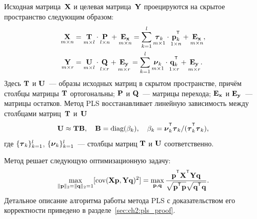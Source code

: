 Исходная матрица~$\mathbf{X}$ и целевая матрица~$\mathbf{Y}$ проецируются на скрытое пространство следующим образом:
\begin{align}
	\label{ch1:eq:PLS_X}
	\underset{m \times n}{\bX} 
	&= \underset{m \times l}{\bT} \cdot \underset{l \times n}{\bP} + \underset{m \times n}{\bE_{\bx}} 
	= \sum_{k=1}^l \underset{m \times 1}{\btau_k} \cdot \underset{1 \times n}{\bp_k^{\T}} + \underset{m \times n}{\bE_{\bx}},\\
	\label{ch1:eq:PLS_Y}
	\underset{m \times r}{\bY} 
	&= \underset{m \times l}{\bU} \cdot \underset{l \times r}{\bQ} + \underset{m \times r}{\bE_{\by}}
	=  \sum_{k=1}^l  \underset{m \times 1}{\bnu_k} \cdot \underset{1 \times r}{\bq_k^{\T}} +  \underset{m \times r}{\bE_{\by}}.
\end{align}
Здесь $\mathbf{T}$ и $\mathbf{U}$~--- образы исходных матриц в скрытом пространстве, причём столбцы матрицы $\mathbf{T}$ ортогональны; $\mathbf{P}$ и $\mathbf{Q}$~--- матрицы перехода; $\mathbf{E}_{\mathbf{x}}$ и $\mathbf{E}_{\mathbf{y}}$~--- матрицы остатков. 
Метод PLS восстанавливает линейную зависимость между столбцами матриц~$\mathbf{T}$ и~$\mathbf{U}$
\begin{equation*}
	\bU \approx \bT \bB, \quad \bB = \text{diag}(\beta_k), \quad \beta_k = \bnu_k^{\T}\btau_k / (\btau_k^{\T}\btau_k),
\end{equation*}
где $\{\boldsymbol{\tau}_k\}_{k=1}^l$, $\{\boldsymbol{\nu}_k\}_{k=1}^l$~--- столбцы матриц $\mathbf{T}$ и $\mathbf{U}$ соответственно.

Метод решает следующую оптимизационную задачу:
\begin{equation}
	\max_{\|\bp\|_{2}=\|\bq\|_{2}=1}[ \text{cov}(\bX \bp, \bY \bq)^{2}] = \max_{\bp, \bq} \frac{\bp^{\T} \bX^{\T} \bY \bq}{\sqrt{\bp^{\T} \bp} \sqrt{\bq^{\T} \bq}}.
	\label{ch1:eq:pls_max_cov}
\end{equation}
Детальное описание алгоритма работы метода PLS с доказательством его корректности приведено в разделе~\ref{sec:ch2:pls_proof}.

